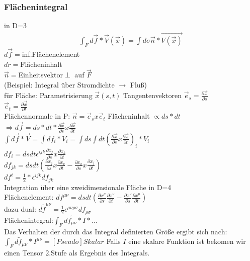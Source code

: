 \documentclass[a4paper]{article}
\begin{document}
\subsubsection{Flächenintegral}
in D=3
\begin{align}
\int_F d\vec{f}*\vec{V}(\vec{x})=\int d\sigma \vec{n}*\vec{V(\vec{x})}
\end{align}
$d\vec{f}=$inf.Flächenelement\\
$dr=$Flächeninhalt\\
$\vec{n}=$Einheitsvektor$\perp$ auf $\vec{F}$\\
(Beispiel: Integral über Stromdichte $\rightarrow$ Fluß)\\
für Fläche: Parametrisierung $\vec{x}(s,t)$
Tangentenvektoren $\vec{e}_s=\frac{\partial\vec{x}}{\partial s}$ \\
$\vec{e}_t=\frac{\partial\vec{x}}{\partial t}$\\
Flächennormale in P: $\vec{n}=\vec{e}_s x \vec{e}_t$
Flächeninhalt $\propto ds*dt$\\
$\Rightarrow d\vec{f}=ds*dt*\frac{\partial\vec{x}}{\partial
s}x\frac{\partial\vec{x}}{\partial t}$\\
$\int d\vec{f}*\vec{V}=\int df_i*V_i=\int ds \int dt
(\frac{\partial\vec{x}}{\partial s}x\frac{\partial\vec{x}}{\partial t})_i *
V_i$\\
$df_i=dsdt\epsilon^{ijk}\frac{\partial x_j}{\partial
s}x\frac{\partial x_k}{\partial t}$\\
$df_{jk}=ds dt \left(\frac{\partial x_j}{\partial
s}x\frac{\partial x_k}{\partial t}-\frac{\partial x_k}{\partial
s}x\frac{\partial x_j}{\partial t}\right)$\\
$df^i=\frac{1}{2}*\epsilon^{ijk} df_{jk}$\\
Integration über eine zweidimensionale Fläche in D=4\\
Flächenelement: $df^{\mu\nu}=ds dt \left(\frac{\partial x^\mu}{\partial
s}\frac{\partial x^\nu}{\partial t}-\frac{\partial x^\nu}{\partial s}
\frac{\partial x^\mu}{\partial t} \right)$\\
dazu dual:
$d\tilde{f}^{\mu\nu}=\frac{1}{2}\epsilon^{\mu\nu\rho\sigma}df_{\rho\sigma}$\\
Flächenintegral:$\int_F d\tilde{f_{\mu\nu}} *I*\ldots$\\
Das Verhalten der durch das Integral definierten Größe ergibt sich nach:\\
$\int_F d\tilde{f}_{\mu\nu} *I^{\mu\nu}=[Pseudo]Skalar$
Falls $I$ eine skalare Funktion ist bekomen wir einen Tensor 2.Stufe als
Ergebnis des Integrals.\\
\end{document}

